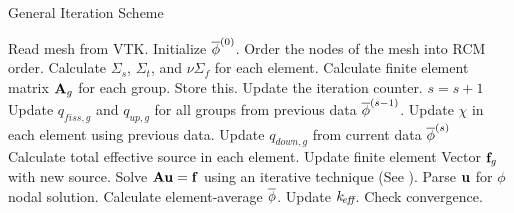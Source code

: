     \begin{algorithm}
      \caption{General Iteration Scheme}
      \label{algorithm:general}
      \begin{algorithmic}[1]
      \State Read mesh from VTK.
      \State Initialize $\overline{\phi}^{(0)}$.
      \State Order the nodes of the mesh into RCM order.
        \label{state:rcm}
      \State Calculate $\Sigma_s$, $\Sigma_t$, and $\nu \Sigma_f$ for each 
        element.
      \State Calculate finite element matrix $\mathbf{A}_g$ for each group. Store this. 
        \label{state:fem_matrix}
        \State Update the iteration counter. $s=s+1$
        \State Update $q_{fiss,g}$ and $q_{up,g}$ for all groups from previous 
          data $\overline{\phi}^{(s-1)}$.
        \State Update $\chi$ in each element using previous data.
          \label{state:chi_collapse}
          \State Update $q_{down,g}$ from current data $\overline{\phi}^{(s)}$
          \State Calculate total effective source in each element.
          \State Update finite element Vector $\mathbf{f}_g$ with new source.
            \label{state:fem_vector}
          \State Solve $\mathbf{A} \mathbf{u} = \mathbf{f}$ using an iterative technique (See
            ).
          \State Parse $\mathbf{u}$ for $\phi$ nodal solution.
          \State Calculate element-average $\overline{\phi}$.
        \EndFor
        \State Update $k_{\!\mbox{\scriptsize \em eff}}$.
        \State Check convergence.
      \EndWhile
      \end{algorithmic}
    \end{algorithm}

